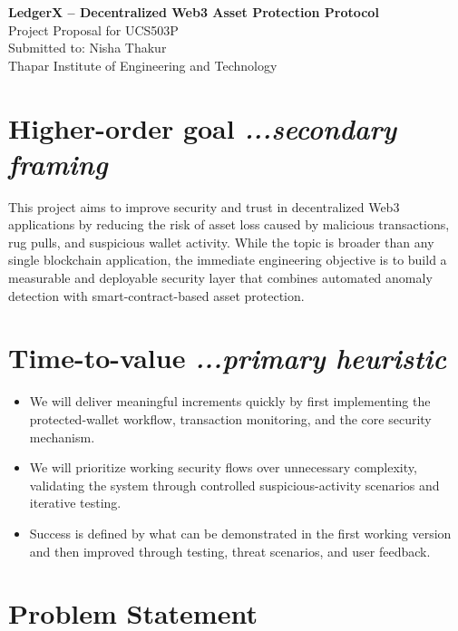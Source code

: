 \documentclass[10pt,a4paper]{article}
\begin{document}
\begin{center}
    {\Large\bfseries LedgerX -- Decentralized Web3 Asset Protection Protocol}\\[4pt]
    {\normalsize Project Proposal for UCS503P}\\[2pt]
    Submitted to: Nisha Thakur\\
    Thapar Institute of Engineering and Technology\\[8pt]
\end{center}

\section{Higher-order goal \hfill \normalfont\itshape ...secondary framing}

This project aims to improve security and trust in decentralized Web3 applications by reducing the risk of asset loss caused by malicious transactions, rug pulls, and suspicious wallet activity. While the topic is broader than any single blockchain application, the immediate engineering objective is to build a measurable and deployable security layer that combines automated anomaly detection with smart-contract-based asset protection.

\section{Time-to-value \hfill \normalfont\itshape ...primary heuristic}

\begin{itemize}
    \item We will deliver meaningful increments quickly by first implementing the protected-wallet workflow, transaction monitoring, and the core security mechanism.

    \item We will prioritize working security flows over unnecessary complexity, validating the system through controlled suspicious-activity scenarios and iterative testing.

    \item Success is defined by what can be demonstrated in the first working version and then improved through testing, threat scenarios, and user feedback.
\end{itemize}

\section{Problem Statement}
\end{document}
